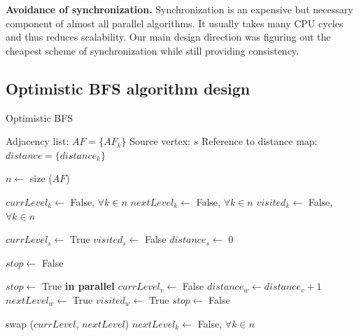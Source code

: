 \documentclass[letterpaper]{article}
\begin{document}
			\textbf{Avoidance of synchronization.}
			Synchronization is an expensive but necessary component of almost all parallel algorithms.
			It usually takes many CPU cycles and thus reduces scalability.
			Our main design direction was figuring out the cheapest scheme of synchronization while still providing consistency.
			
			
		\subsection{Optimistic BFS algorithm design}
		
			\begin{algorithm}[h]
				\caption{Optimistic BFS}
				\label{alg:optbfs}
				\begin{algorithmic}[1]
					\Require
						\Statex Adjacency list: $AF = \lbrace AF_k \rbrace$
						\Statex Source vertex: $s$
						\Statex Reference to distance map: $distance = \lbrace distance_k \rbrace$
					\Statex

					\State $n \gets$ size ($AF$) 					
					
					\State $currLevel_k \gets$ False, $\forall k \in n$
					\State $nextLevel_k \gets$ False, $\forall k \in n$
					\State $visited_k \gets$ False, $\forall k \in n$
					\Statex
					
					\State $currLevel_s \gets$ True
					\State $visited_s \gets$ False
					\State $distance_s \gets$ 0
					\Statex
					
					\State $stop \gets$ False
					\Statex
					
						\State $stop\gets$ True
						 \textbf{in parallel}
								\State $currLevel_v \gets$ False
										\State $distance_w \gets distance_v + 1$
										\State $nextLevel_w \gets$ True
										\State $visited_w \gets$ True
										\State $stop \gets$ False
									\EndIf
								\EndFor
							\EndIf
						\EndFor
						
						\vspace{-0.051cm} %
						
						\State swap ($currLevel$, $nextLevel$)
						\State $nextLevel_k \gets$ False, $\forall k\in n$
					\EndWhile
				\end{algorithmic}
			\end{algorithm}

		
		
\end{document}
